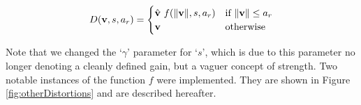 \begin{equation}
    \label{eq:distortionCase}
    D(\mathbf{v}, s, a_r) =
    \begin{cases}
        \hat{\mathbf{v}} ~ f(\lVert\mathbf{v}\rVert, s, a_r)    &\text{if } \lVert\mathbf{v}\rVert \leq a_r\\
        \mathbf{v}                                                         &\text{otherwise}
    \end{cases}
\end{equation}

Note that we changed the `$\gamma $' parameter for `$s$', which is due to this parameter no longer denoting a cleanly defined gain, but a vaguer concept of strength. Two notable instances of the function $f$ were implemented. They are shown in Figure \ref{fig:otherDistortions} and are described hereafter.

